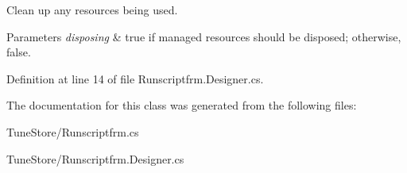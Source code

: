 Clean up any resources being used. 


\begin{DoxyParams}{Parameters}
{\em disposing} & true if managed resources should be disposed; otherwise, false.\\
\hline
\end{DoxyParams}


Definition at line 14 of file Runscriptfrm.\+Designer.\+cs.



The documentation for this class was generated from the following files\+:\begin{DoxyCompactItemize}
\item 
Tune\+Store/Runscriptfrm.\+cs\item 
Tune\+Store/Runscriptfrm.\+Designer.\+cs\end{DoxyCompactItemize}
